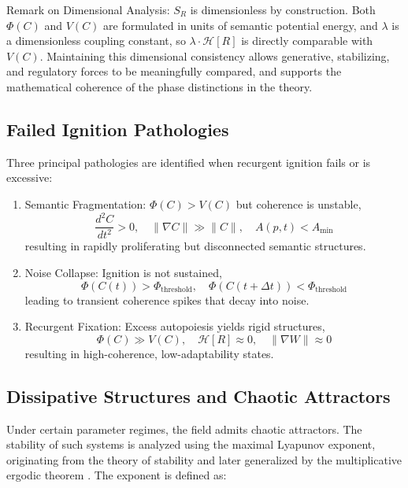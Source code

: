 Remark on Dimensional Analysis: \(S_R\) is dimensionless by construction. Both \(\Phi(C)\) and \(V(C)\) are formulated in units of semantic potential energy, and \(\lambda\) is a dimensionless coupling constant, so \(\lambda \cdot \mathcal{H}[R]\) is directly comparable with \(V(C)\). Maintaining this dimensional consistency allows generative, stabilizing, and regulatory forces to be meaningfully compared, and supports the mathematical coherence of the phase distinctions in the theory.

\subsection{Failed Ignition Pathologies}

Three principal pathologies are identified when recurgent ignition fails or is excessive:

\begin{enumerate}
    \item Semantic Fragmentation: \(\Phi(C) > V(C)\) but coherence is unstable,
    \begin{equation}
    \frac{d^2C}{dt^2} > 0, \quad \|\nabla C\| \gg \|C\|, \quad A(p,t) < A_{\text{min}}
    \end{equation}
    resulting in rapidly proliferating but disconnected semantic structures.
    \item Noise Collapse: Ignition is not sustained,
    \begin{equation}
    \Phi(C(t)) > \Phi_{\text{threshold}}, \quad \Phi(C(t+\Delta t)) < \Phi_{\text{threshold}}
    \end{equation}
    leading to transient coherence spikes that decay into noise.
    \item Recurgent Fixation: Excess autopoiesis yields rigid structures,
    \begin{equation}
    \Phi(C) \gg V(C), \quad \mathcal{H}[R] \approx 0, \quad \|\nabla W\| \approx 0
    \end{equation}
    resulting in high-coherence, low-adaptability states.
\end{enumerate}

\subsection{Dissipative Structures and Chaotic Attractors}

Under certain parameter regimes, the field admits chaotic attractors. The stability of such systems is analyzed using the maximal Lyapunov exponent, originating from the theory of stability \autocite{Lyapunov1907} and later generalized by the multiplicative ergodic theorem \autocite{Oseledets1968}. The exponent is defined as:

